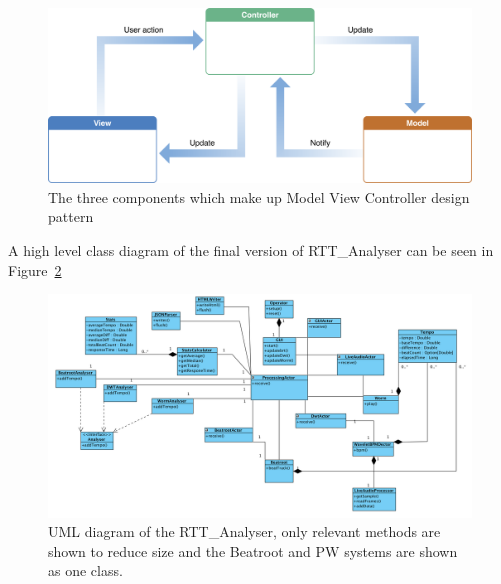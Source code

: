 \documentclass[a4paper, 11pt]{article}
\begin{document}
\begin{figure}[h]
	\centering
	\includegraphics[scale=0.25]{images/mvc.png}
	\caption{The three components which make up Model View Controller design pattern \cite{applemvc}}
	\label{fig: mvc}
\end{figure}

A high level class diagram of the final version of RTT\_Analyser can be seen in Figure~\ref{fig: uml} 

\begin{figure}
	\centering
	\includegraphics[scale=0.3]{images/RTTUMLDiagram.jpg}
	\caption{UML diagram of the RTT\_Analyser, only relevant methods are shown to reduce size and the Beatroot and PW systems are shown as one class.}
	\label{fig: uml}
\end{figure}
\clearpage
\end{document}
